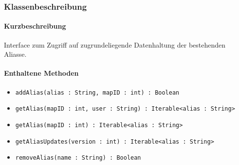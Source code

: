 \subsubsection*{Klassenbeschreibung}%
\paragraph*{Kurzbeschreibung}
Interface zum Zugriff auf zugrundeliegende Datenhaltung der bestehenden Aliasse.
\paragraph*{Enthaltene Methoden}
\begin{itemize}
    \item \texttt{addAlias(alias : String, mapID : int) : Boolean}
    \item \texttt{getAlias(mapID : int, user : String) : Iterable<alias : String>}
    \item \texttt{getAlias(mapID : int) : Iterable<alias : String>}
    \item \texttt{getAliasUpdates(version : int) : Iterable<alias : String>}
    \item \texttt{removeAlias(name : String) : Boolean}
\end{itemize}
